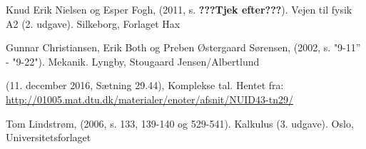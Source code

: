 \begin{thebibliography}{9}


 
  Knud Erik Nielsen og Esper Fogh,
  (2011, s. \textbf{???Tjek efter???}). 
  Vejen til fysik A2 (2. udgave). 
  Silkeborg,
  Forlaget Hax

  Gunnar Christiansen, Erik Both og Preben Østergaard Sørensen,
  (2002, s. "9-11'' - "9-22"). 
  Mekanik. 
  Lyngby,
  Stougaard Jensen/Albertlund
  
(11. december 2016, Sætning 29.44), Komplekse tal. Hentet fra:
\url{http://01005.mat.dtu.dk/materialer/enoter/afsnit/NUID43-tn29/}

  Tom Lindstrøm,
  (2006, s. 133, 139-140 og 529-541). 
  Kalkulus (3. udgave). 
  Oslo,
  Universitetsforlaget
  
  
\end{thebibliography}